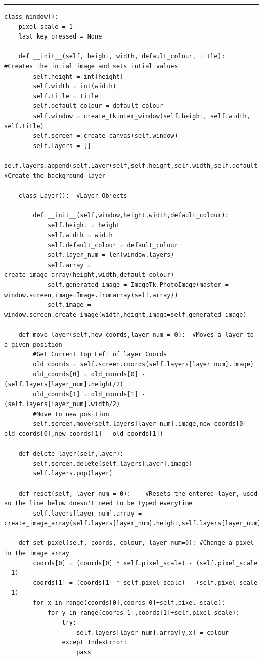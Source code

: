 \documentclass{article}
\begin{document}
\textcolor[RGB]{220,220,220}{\rule{\linewidth}{0.2pt}}
\begin{lstlisting}
class Window():
    pixel_scale = 1
    last_key_pressed = None
    
    def __init__(self, height, width, default_colour, title):   #Creates the intial image and sets intial values
        self.height = int(height)
        self.width = int(width)
        self.title = title
        self.default_colour = default_colour
        self.window = create_tkinter_window(self.height, self.width, self.title)
        self.screen = create_canvas(self.window)
        self.layers = []
        self.layers.append(self.Layer(self,self.height,self.width,self.default_colour)) #Create the background layer

    class Layer():  #Layer Objects

        def __init__(self,window,height,width,default_colour):
            self.height = height
            self.width = width
            self.default_colour = default_colour
            self.layer_num = len(window.layers)
            self.array = create_image_array(height,width,default_colour)
            self.generated_image = ImageTk.PhotoImage(master = window.screen,image=Image.fromarray(self.array))
            self.image = window.screen.create_image(width,height,image=self.generated_image)

    def move_layer(self,new_coords,layer_num = 0):  #Moves a layer to a given position
        #Get Current Top Left of layer Coords
        old_coords = self.screen.coords(self.layers[layer_num].image)
        old_coords[0] = old_coords[0] - (self.layers[layer_num].height/2)
        old_coords[1] = old_coords[1] - (self.layers[layer_num].width/2)
        #Move to new position
        self.screen.move(self.layers[layer_num].image,new_coords[0] - old_coords[0],new_coords[1] - old_coords[1])

    def delete_layer(self,layer):
        self.screen.delete(self.layers[layer].image)
        self.layers.pop(layer) 

    def reset(self, layer_num = 0):    #Resets the entered layer, used so the line below doesn't need to be typed everytime
        self.layers[layer_num].array = create_image_array(self.layers[layer_num].height,self.layers[layer_num].width,self.layers[layer_num].default_colour)

    def set_pixel(self, coords, colour, layer_num=0): #Change a pixel in the image array
        coords[0] = (coords[0] * self.pixel_scale) - (self.pixel_scale - 1)
        coords[1] = (coords[1] * self.pixel_scale) - (self.pixel_scale - 1)
        for x in range(coords[0],coords[0]+self.pixel_scale):
            for y in range(coords[1],coords[1]+self.pixel_scale):
                try:
                    self.layers[layer_num].array[y,x] = colour
                except IndexError:
                    pass   


\end{lstlisting}
\end{document}
